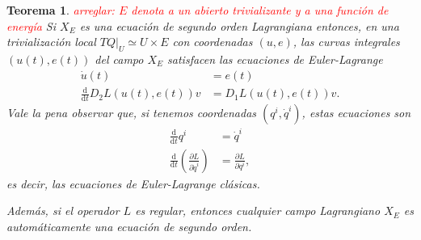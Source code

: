 \documentclass[11pt, a4paper]{article}
\newcommand{\dd}{\mathrm{d}}
\newcommand{\ddt}{\frac{\dd}{\dd t}}
\newcommand{\pardev}[2]{\frac{\partial #1}{\partial #2}}
\theoremstyle{plain}
\newtheorem{thm}[prop]{Teorema}
\theoremstyle{definition}
\begin{document}
\begin{thm} \textcolor{red}{arreglar: $E$ denota a un abierto trivializante y a una función de energía} Si $X_E$ es una ecuación de segundo orden Lagrangiana entonces, en una trivialización local $TQ|_U \simeq U\times E$ con coordenadas $(u,e)$, las curvas integrales $(u(t),e(t))$ del campo $X_E$ satisfacen las ecuaciones de Euler-Lagrange
\begin{align*}
\dot{u}(t)&=e(t)\\
\ddt D_2 L(u(t),e(t)) v &= D_1L(u(t),e(t))v.
\end{align*}
Vale la pena observar que, si tenemos coordenadas $(q^i,\dot{q}^i)$, estas ecuaciones son
\begin{align*}
\ddt q^i &=\dot{q}^i\\
\ddt \left( \pardev{L}{\dot{q}^i}\right)&= \pardev{L}{q^i},
\end{align*}
es decir, las ecuaciones de Euler-Lagrange clásicas.

Además, si el operador $L$ es regular, entonces cualquier campo Lagrangiano $X_E$ es automáticamente una ecuación de segundo orden.
\end{thm}
\end{document}
